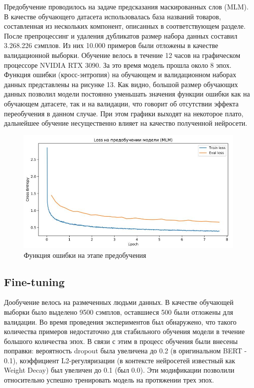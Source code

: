 \documentclass[12pt,a4paper]{article}
\begin{document}
Предобучение проводилось на задаче предсказания маскированных слов (MLM). В качестве обучающего датасета использовалась база названий товаров, составленная из нескольких компонент, описанных в соответствующем разделе. После препроцессинг и удаления дубликатов размер набора данных составил 3.268.226 сэмплов. Из них 10.000 примеров были отложены в качестве валидационной выборки. Обучение велось в течение 12 часов на графическом процессоре NVIDIA RTX 3090. За это время модель прошла около 8 эпох. Функция ошибки (кросс-энтропия) на обучающем и валидационном наборах данных представлены на рисунке 13. Как видно, большой размер обучающих данных позволил модели постоянно уменьшать значения функции ошибки как на обучающем датасете, так и на валидации, что говорит об отсутствии эффекта переобучения в данном случае. При этом графики выходят на некоторое плато, дальнейшее обучение несущественно влияет на качество полученной нейросети.

\begin{figure}[H]
	\begin{center}
		\includegraphics[scale=0.4]{loss_pretrain.jpg}
	\end{center}
	\caption{Функция ошибки на этапе предобучения}
\end{figure}

\noindent 

\subsection{Fine-tuning}

Дообучение велось на размеченных людьми данных. В качестве обучающей выборки было выделено 9500 сэмплов, оставшиеся 500 были отложены для валидации. Во время проведения экспериментов был обнаружено, что такого количества примеров недостаточно для стабильного обучения модели в течение большого количества эпох. В связи с этим в процесс обучения были внесены поправки: вероятность dropout была увеличена до 0.2 (в оригинальном BERT - 0.1), коэффициент L2-регуляризации (в контексте нейросетей известный как Weight Decay) был увеличен до 0.1 (был 0.0). Эти модификации позволили относительно успешно тренировать модель на протяжении трех эпох.
\end{document}
